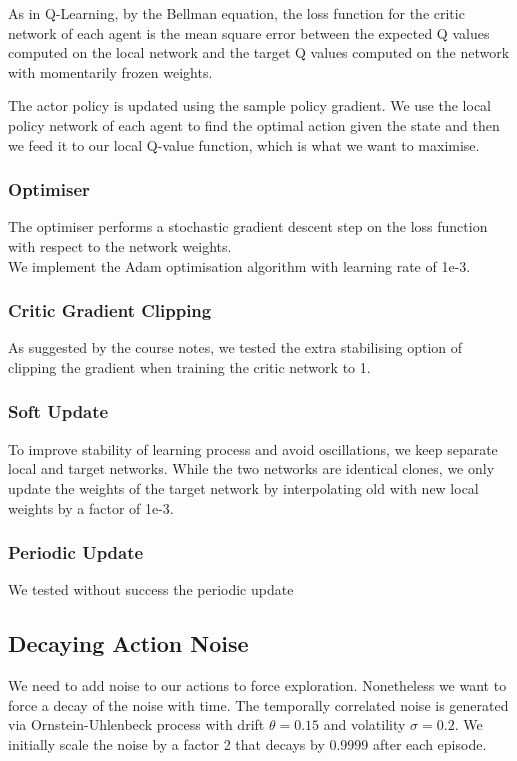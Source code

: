 \documentclass[pagenumber=off]{article}
\begin{document}
As in Q-Learning, by the Bellman equation, the loss function for the critic network  of each agent is the mean square error between the expected Q values computed on the local network and the target Q values computed on the network with momentarily frozen weights.

The actor policy is updated using the sample policy gradient. We use the local policy network of each agent to find the optimal action given the state and then we feed it to our local Q-value function, which is what we want to maximise. 

\subsubsection{Optimiser}

The optimiser performs a stochastic gradient descent step on the loss function with respect to the network weights.\\
We implement the Adam optimisation algorithm with learning rate of 1e-3.\\


\subsubsection{Critic Gradient Clipping}

As suggested by the course notes, we tested the extra stabilising option of clipping the gradient when training the critic network to 1.


\subsubsection{Soft Update}

To improve stability of learning process and avoid oscillations, we keep separate local and target networks. While the two networks are identical clones, we only update the weights of the target network by interpolating old with new local weights by a factor of 1e-3.

\subsubsection{Periodic Update}

We tested without success the periodic update  


\subsection{Decaying Action Noise}
We need to add noise to our actions to force exploration. Nonetheless we want to force a decay of the noise with time.
The temporally correlated noise is generated via Ornstein-Uhlenbeck process with drift $\theta=0.15$ and volatility $\sigma=0.2$.
We initially scale the noise by a factor 2 that decays by 0.9999 after each episode.
\end{document}
